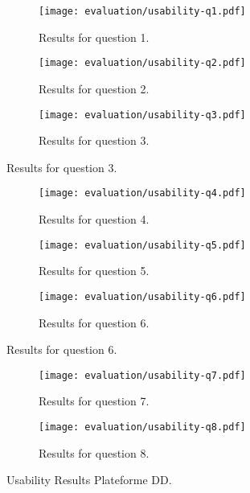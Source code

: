 \begin{figure}[h]
	\centering
	\begin{subfigure}{.8\textwidth}
  		\centering
  		\texttt{[image: evaluation/usability-q1.pdf]}
  		\caption{Results for question 1.}
	\end{subfigure}\par\bigskip
	
	\begin{subfigure}{.8\textwidth}
  		\centering
  		\texttt{[image: evaluation/usability-q2.pdf]}
  		\caption{Results for question 2.}
	\end{subfigure}\par\bigskip
	
	\begin{subfigure}{.8\textwidth}
  		\centering
  		\texttt{[image: evaluation/usability-q3.pdf]}
  		\caption{Results for question 3.}
	\end{subfigure}
\end{figure}

\begin{figure}\ContinuedFloat
	\centering
	\begin{subfigure}{.8\textwidth}
  		\centering
  		\texttt{[image: evaluation/usability-q4.pdf]}
  		\caption{Results for question 4.}
	\end{subfigure}\par\bigskip
	
	\begin{subfigure}{.8\textwidth}
  		\centering
  		\texttt{[image: evaluation/usability-q5.pdf]}
  		\caption{Results for question 5.}
	\end{subfigure}\par\bigskip
	
	\begin{subfigure}{.8\textwidth}
  		\centering
  		\texttt{[image: evaluation/usability-q6.pdf]}
  		\caption{Results for question 6.}
	\end{subfigure}
\end{figure}

\begin{figure}\ContinuedFloat
	\centering
	\begin{subfigure}{.8\textwidth}
  		\centering
  		\texttt{[image: evaluation/usability-q7.pdf]}
  		\caption{Results for question 7.}
	\end{subfigure}\par\bigskip
	
	\begin{subfigure}{.8\textwidth}
  		\centering
  		\texttt{[image: evaluation/usability-q8.pdf]}
  		\caption{Results for question 8.}
	\end{subfigure}
	\caption{Usability Results Plateforme DD.}
	\label{fig:evaluation-pdd-usability}
\end{figure}



